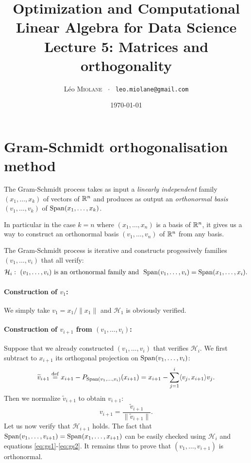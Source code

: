 \documentclass[11pt,nocut]{article}
\title{\vspace{-2.0cm}%
	Optimization and Computational Linear Algebra for Data Science\\
Lecture 5: Matrices and orthogonality}
\author{Léo \textsc{Miolane} \ $\cdot$ \ \texttt{leo.miolane@gmail.com}}
\date{\today}
\begin{document}
\maketitle


\section{Gram-Schmidt orthogonalisation method}\label{sec:gram_schmidt}

The Gram-Schmidt process takes as input a \emph{linearly independent} family $(x_1, \dots, x_k)$ of vectors of $\mathbb{R}^n$ and produces as output an \emph{orthonormal basis} $(v_1, \dots, v_k)$ of ${{\rm Span}}(x_1, \dots, x_k)$.

In particular in the case $k=n$ where $(x_1, \dots, x_n)$ is a basis of $\mathbb{R}^n$, it gives us a way to construct an orthonormal basis $(v_1, \dots ,v_n)$ of $\mathbb{R}^n$ from any basis.

The Gram-Schmidt process is iterative and constructs progessively families $(v_1, \dots, v_i)$ that all verify:
	\begin{align*}
		\mathcal{H}_i: \ (v_1, \dots, v_i) \ \text{is an orthonormal family and} \  \ {{\rm Span}}(v_1, \dots, v_i) = {{\rm Span}}(x_1, \dots, x_i).
\end{align*}

\paragraph{Construction of $v_1$:} We simply take $v_1 = x_1 / \|x_1\|$ and $\mathcal{H}_1$ is obviously verified.

\paragraph{Construction of $v_{i+1}$ from $(v_1, \dots, v_i)$:} 
Suppose that we already constructed $(v_1, \dots, v_i)$ that verifies $\mathcal{H}_i$.
We first subtract to $x_{i+1}$ its orthogonal projection on ${{\rm Span}}(v_1, \dots, v_i)$:
\begin{equation}\label{eq:gs1}
\widetilde{v}_{i+1} \overset{\rm def}{=} 
x_{i+1} - P_{{{\rm Span}}(v_1, \dots, v_i)}(x_{i+1}) =
x_{i+1} - \sum_{j=1}^i \langle v_j, x_{i+1} \rangle v_j.
\end{equation}
Then we normalize $\widetilde{v}_{i+1}$ to obtain $v_{i+1}$:
\begin{equation}\label{eq:gs2}
v_{i+1} = \frac{\widetilde{v}_{i+1}}{\| \widetilde{v}_{i+1} \|}.
\end{equation}
Let us now verify that $\mathcal{H}_{i+1}$ holds. 
The fact that ${{\rm Span}}(v_1, \dots, v_{i+1}) = {{\rm Span}}(x_1, \dots, x_{i+1})$ can be easily checked using $\mathcal{H}_i$ and equations \eqref{eq:gs1}-\eqref{eq:gs2}.
It remains thus to prove that $(v_1, \dots, v_{i+1})$ is orthonormal.
\end{document}
